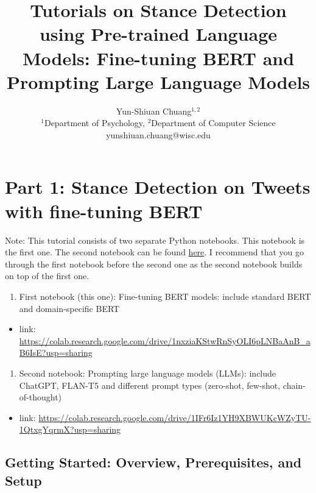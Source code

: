 \documentclass[11pt]{article}
\title{Tutorials on Stance Detection using Pre-trained Language Models: Fine-tuning BERT and Prompting Large Language Models}
\author{Yun-Shiuan Chuang$^{1,2}$\\
	\small $^{1}$Department of Psychology, $^{2}$Department of Computer Science\\
	\small yunshiuan.chuang@wisc.edu}
\date{}
\providecommand{\tightlist}{%
      \setlength{\itemsep}{0pt}\setlength{\parskip}{0pt}}
\begin{document}
    
    \maketitle
    
    

    
    \hypertarget{stance-detection-on-tweets-using-nlp-methods---part-1}{%
\section{Part 1: Stance Detection on Tweets with fine-tuning BERT}\label{stance-detection-on-tweets-using-nlp-methods---part-1}}

Note: This tutorial consists of two separate Python notebooks. This
notebook is the first one. The second notebook can be found
\href{https://colab.research.google.com/drive/1IFr6Iz1YH9XBWUKcWZyTU-1QtxgYqrmX?usp=sharing}{here}.
I recommend that you go through the first notebook before the second one
as the second notebook builds on top of the first one.

\begin{enumerate}
\def\labelenumi{\arabic{enumi}.}
\tightlist
\item
  First notebook (this one): Fine-tuning BERT models: include standard
  BERT and domain-specific BERT
\end{enumerate}

\begin{itemize}
\tightlist
\item
  link:
  \url{https://colab.research.google.com/drive/1nxziaKStwRnSyOLI6pLNBaAnB_aB6IsE?usp=sharing}
\end{itemize}

\begin{enumerate}
\def\labelenumi{\arabic{enumi}.}
\setcounter{enumi}{1}
\tightlist
\item
  Second notebook: Prompting large language models (LLMs): include
  ChatGPT, FLAN-T5 and different prompt types (zero-shot, few-shot,
  chain-of-thought)
\end{enumerate}

\begin{itemize}
\tightlist
\item
  link:
  \url{https://colab.research.google.com/drive/1IFr6Iz1YH9XBWUKcWZyTU-1QtxgYqrmX?usp=sharing}
\end{itemize}

    \hypertarget{getting-started-overview-prerequisites-and-setup}{%
\subsection{Getting Started: Overview, Prerequisites, and
Setup}\label{getting-started-overview-prerequisites-and-setup}}
\end{document}
